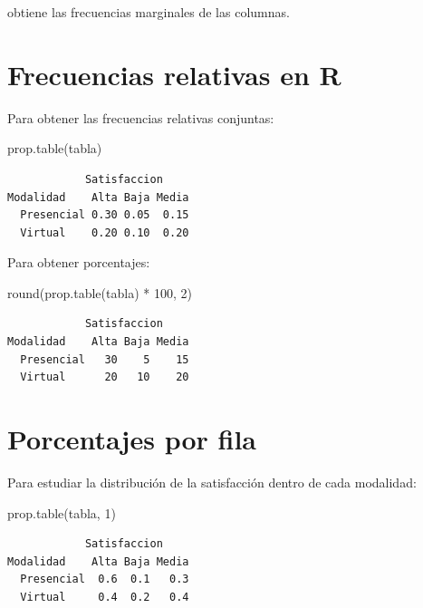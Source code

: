 \documentclass[
  spanish,
  14pt,
  letterpaper,
  DIV=11,
  numbers=noendperiod]{scrartcl}
\newenvironment{Shaded}{\begin{snugshade}}{\end{snugshade}}
\newcommand{\DecValTok}[1]{\textcolor[rgb]{0.68,0.51,1.00}{#1}}
\newcommand{\FunctionTok}[1]{\textcolor[rgb]{0.65,0.89,0.18}{#1}}
\newcommand{\NormalTok}[1]{\textcolor[rgb]{0.97,0.97,0.95}{#1}}
\newcommand{\SpecialCharTok}[1]{\textcolor[rgb]{0.68,0.51,1.00}{#1}}
\begin{document}
obtiene las frecuencias marginales de las columnas.

\section{Frecuencias relativas en R}\label{frecuencias-relativas-en-r}

Para obtener las frecuencias relativas conjuntas:

\begin{Shaded}
\begin{Highlighting}[]
\FunctionTok{prop.table}\NormalTok{(tabla)}
\end{Highlighting}
\end{Shaded}

\begin{verbatim}
            Satisfaccion
Modalidad    Alta Baja Media
  Presencial 0.30 0.05  0.15
  Virtual    0.20 0.10  0.20
\end{verbatim}

Para obtener porcentajes:

\begin{Shaded}
\begin{Highlighting}[]
\FunctionTok{round}\NormalTok{(}\FunctionTok{prop.table}\NormalTok{(tabla) }\SpecialCharTok{*} \DecValTok{100}\NormalTok{, }\DecValTok{2}\NormalTok{)}
\end{Highlighting}
\end{Shaded}

\begin{verbatim}
            Satisfaccion
Modalidad    Alta Baja Media
  Presencial   30    5    15
  Virtual      20   10    20
\end{verbatim}

\section{Porcentajes por fila}\label{porcentajes-por-fila}

Para estudiar la distribución de la satisfacción dentro de cada
modalidad:

\begin{Shaded}
\begin{Highlighting}[]
\FunctionTok{prop.table}\NormalTok{(tabla, }\DecValTok{1}\NormalTok{)}
\end{Highlighting}
\end{Shaded}

\begin{verbatim}
            Satisfaccion
Modalidad    Alta Baja Media
  Presencial  0.6  0.1   0.3
  Virtual     0.4  0.2   0.4
\end{verbatim}
\end{document}
